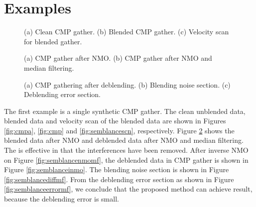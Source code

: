 \section{Examples}

\begin{figure}[htb!]
\centering
{}
\caption{(a) Clean CMP gather. (b) Blended CMP gather. (c) Velocity scan for blended  gather.}
\label{fig:cmpa,cmp,semblancescn}
\end{figure}

\begin{figure}[htb!]
\centering
{}
\caption{(a) CMP gather after NMO. (b) CMP gather after NMO and median filtering.}
\label{fig:semblancenmo,semblancenmomf}
\end{figure}

\begin{figure}[htb!]
\centering
{}
\caption{(a) CMP gathering after deblending. (b) Blending noise section. (c) Deblending error section.}
\label{fig:semblanceinmo,semblancediffmf,semblanceerrormf}
\end{figure}
The first example is a single synthetic CMP gather. The clean unblended data, blended data\new{,} and velocity scan of the blended data are shown in Figures \ref{fig:cmpa}, \ref{fig:cmp}\new{,} and \ref{fig:semblancescn}, respectively. Figure \ref{fig:semblancenmo,semblancenmomf} shows the blended data after NMO  and deblended data after NMO  and median filtering. The  is effective in that  the interferences have been removed. After inverse NMO on Figure \ref{fig:semblancenmomf}, the deblended data in CMP gather is shown in Figure \ref{fig:semblanceinmo}. The blending noise section is shown in Figure \ref{fig:semblancediffmf}. From the deblending error section as shown in Figure \ref{fig:semblanceerrormf}, we conclude that the proposed method can achieve  result, because the deblending error is small.

